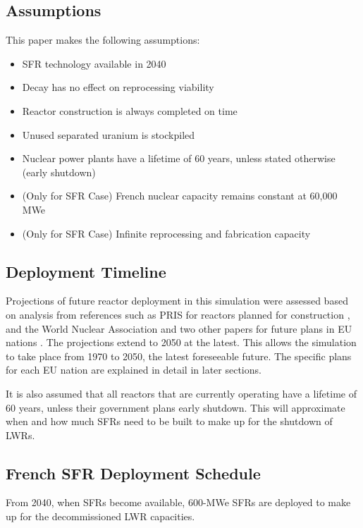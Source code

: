 \subsection{Assumptions}
This paper makes the following assumptions:
\begin{itemize}
        \item \gls{SFR} technology available in 2040
        \item Decay has no effect on reprocessing viability
        \item Reactor construction is always completed on time 
        \item Unused separated uranium is stockpiled
        \item Nuclear power plants have a lifetime of 60 years, unless stated otherwise (early shutdown)
        \item (Only for SFR Case) French nuclear capacity remains constant at 60,000 MWe
        \item (Only for SFR Case) Infinite reprocessing and fabrication capacity
\end{itemize}


\subsection{Deployment Timeline}
Projections of future reactor deployment in this simulation were
assessed based on analysis from references such as \gls{PRIS} for reactors planned for construction \cite{iaea_pris_nodate},
and the World Nuclear Association and two other papers for future plans in EU nations
\cite{world_nuclear_association_nuclear_2017, joskow_future_2012, hatch_politics_2015}.
The projections extend to 2050 at the latest. This allows the simulation to take place from
1970 to 2050, the latest foreseeable future. The specific plans for each \gls{EU} nation are explained
in detail in later sections.

It is also assumed that all reactors that are 
currently operating have a lifetime of 60 years, unless their government plans
early shutdown. This will approximate when and how much \glspl{SFR} need to be built
to make up for the shutdown of \glspl{LWR}.

\subsection{French \gls{SFR} Deployment Schedule}

From 2040, when \gls{SFR}s become available,
600-MWe \gls{SFR}s are deployed to make up for the 
decommissioned \gls{LWR} capacities.


